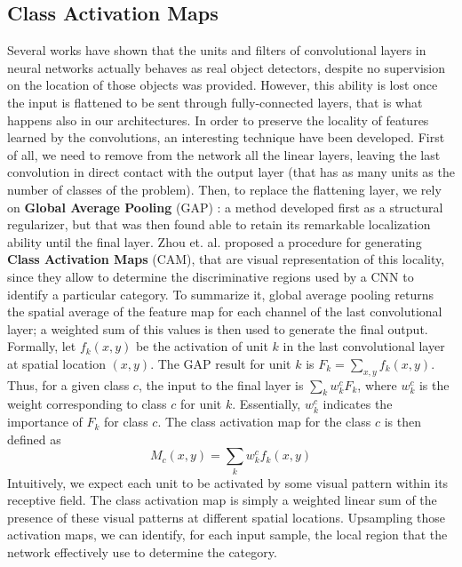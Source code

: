 \documentclass[../main.tex]{subfiles}
\begin{document}
\subsection{Class Activation Maps}

Several works have shown that the units and filters of convolutional layers in neural networks actually behaves as real object detectors, despite no supervision on the location of those objects was provided. However, this ability is lost once the input is flattened to be sent through fully-connected layers, that is what happens also in our architectures. In order to preserve the locality of features learned by the convolutions, an interesting technique have been developed. First of all, we need to remove from the network all the linear layers, leaving the last convolution in direct contact with the output layer (that has as many units as the number of classes of the problem). Then, to replace the flattening layer, we rely on \textbf{Global Average Pooling} (GAP) \cite{network_in_network}: a method developed first as a structural regularizer, but that was then found able to retain its remarkable localization
ability until the final layer. Zhou et. al. \cite{class_activation_maps} proposed a procedure for generating \textbf{Class Activation Maps} (CAM), that are visual representation of this locality, since they allow to determine the discriminative regions used by a CNN to identify a particular category. To summarize it, global average pooling returns the spatial average of the feature map for each channel of the last convolutional layer; a weighted sum of this values is then used to generate the final output.\\
Formally, let $f_k(x,y)$ be the activation of unit $k$ in the last convolutional layer at spatial location $(x,y)$. The GAP result for unit $k$ is $F_k = \sum_{x,y}f_k(x,y)$. Thus, for a given class $c$, the input to the final layer is $\sum_k w^c_kF_k	$, where $w^c_k$ is the weight corresponding to class $c$ for unit $k$. Essentially, $w^c_k$ indicates the importance of $F_k$ for class $c$. The class activation map for the class $c$ is then defined as 
\[ M_c(x,y) = \sum_k w^c_k f_k(x,y) \]
Intuitively, we expect each
unit to be activated by some visual pattern within its receptive field. The class activation map is simply a weighted linear sum of the presence of these visual patterns at different spatial locations. Upsampling those activation maps, we can identify, for each input sample, the local region that the network effectively use to determine the category.\\
\end{document}
